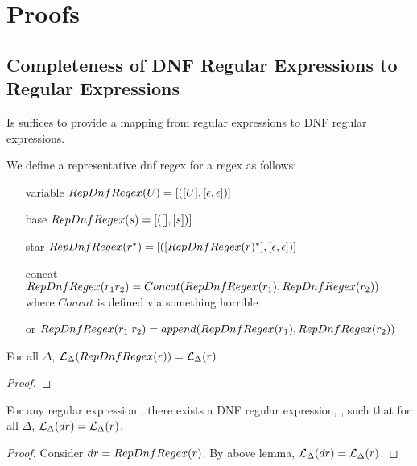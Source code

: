 \section{Proofs}
\subsection{Completeness of DNF Regular Expressions to Regular Expressions}
Is suffices to provide a mapping from regular expressions to DNF regular
expressions.
\begin{definition}[RepDnfRegex]
We define a representative dnf regex for a regex as follows:
\begin{itemize}
\item[variable] $RepDnfRegex(U)=[([U],[\epsilon,\epsilon])]$
\item[base] $RepDnfRegex(s)=[([],[s])]$
\item[star] $RepDnfRegex(r^*) = [([RepDnfRegex(r)^*],[\epsilon,\epsilon])]$
\item[concat] $RepDnfRegex(r_1r_2) = Concat(RepDnfRegex(r_1),RepDnfRegex(r_2))$ where $Concat$ is defined via something horrible
\item[or] $RepDnfRegex(r_1|r_2) = append(RepDnfRegex(r_1),RepDnfRegex(r_2))$
\end{itemize}
\end{definition}

\begin{lemma}
For all $\Delta$, $\mathcal{L}_{\Delta}(RepDnfRegex(r)) = \mathcal{L}_{\Delta}(r)$
\begin{proof}
\end{proof}
\end{lemma}

\begin{theorem}
For any regular expression \Regex{}, there exists a DNF regular expression, \DNFRegex{},
such that for all $\Delta$, $\mathcal{L}_{\Delta}(dr) = \mathcal{L}_{\Delta}(r)$.
\begin{proof}
Consider $dr=RepDnfRegex(r)$.  By above lemma, $\mathcal{L}_{\Delta}(dr)=\mathcal{L}_{\Delta}(r)$.
\end{proof}
\end{theorem}


